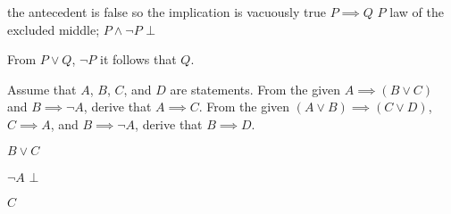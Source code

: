 \documentclass{report}
\begin{document}
\begin{Answer}
  \begin{structured_derivation}
    \begin{nested_derivation}
      \observation
        {the antecedent is false so the implication is vacuously true}
        {$P \implies Q$}
      \observation
        {}
        {$P$}
      \observation
        {law of the excluded middle; $P \land \neg{P}$}
        {$\bot$}      
    \end{nested_derivation}
  \end{structured_derivation}
\end{Answer}

\begin{theorem}
  From $P \lor Q$, $\neg{P}$ it follows that $Q$.
\end{theorem}

\begin{Exercise} [number=11]
  Assume that $A$, $B$, $C$, and $D$ are statements.
  \Question From the given $A \implies (B \lor C)$ and $B \implies \neg{A}$, derive that $A \implies C$.
  \Question From the given $(A \lor B) \implies (C \lor D)$, $C \implies A$, and $B \implies \neg{A}$, derive that $B \implies D$.
\end{Exercise}

\begin{Answer} [number=11.1]
  \begin{structured_derivation}
    \begin{nested_derivation}
        {$B \lor C$}
      \begin{nested_derivation}
          {$\neg{A}$}
          {$\bot$}
      \end{nested_derivation}
        {$C$}
    \end{nested_derivation}
  \end{structured_derivation}
\end{Answer}
\end{document}
